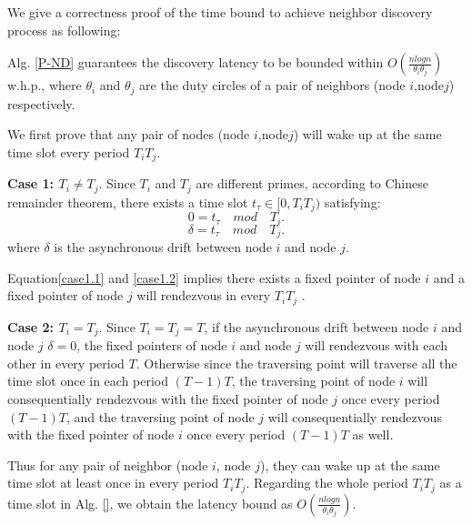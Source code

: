 We give a correctness proof of the time 
bound to achieve neighbor discovery process as following:


\begin{theorem}
\label{PBND1}
Alg. \ref{P-ND} guarantees the discovery latency
to be bounded within $O(\frac{nlogn}{\theta_i\theta_j})$ w.h.p.,
where $\theta_i$ and $\theta_j$ are the duty circles of 
a pair of neighbors (node $i$,node$j$) respectively.
\end{theorem}



\begin{IEEEproof}
We first prove that any pair of nodes (node $i$,node$j$) will wake up 
at the same time slot every period $T_iT_j$.

\textbf{Case 1: $T_i \neq T_j$}. Since $T_i$ and $T_j$ are different primes, 
according to Chinese remainder theorem, there exists a time slot $t_\tau \in \lbrack 0,T_iT_j ) $ satisfying:
\begin{equation}
\label{case1.1}
0 = t_\tau  \quad mod \quad  T_i.
\end{equation}
\begin{equation}
\label{case1.2}
\delta = t_\tau  \quad mod \quad  T_j.
\end{equation}
where $\delta$ is the asynchronous drift between node $i$ and node $j$.

Equation\ref{case1.1} and \ref{case1.2}  implies there exists a fixed pointer of node $i$ 
and a fixed pointer of node $j$ will rendezvous in every $T_iT_j$  .

\textbf{Case 2: $T_i = T_j$}. Since $T_i = T_j = T$, if the asynchronous drift between 
node $i$ and node $j$ $\delta = 0$, the fixed pointers of node $i$ and node $j$ will 
rendezvous with each other in every period $T$.
Otherwise since the traversing point will traverse all the time slot once in each period $(T-1)T$,
the traversing point of node $i$ will consequentially rendezvous with the fixed pointer
of node $j$ once every period $(T-1)T$, and the traversing point of node $j$ 
will consequentially rendezvous with the fixed pointer
of node $i$ once every period $(T-1)T$ as well.

Thus for any pair of neighbor (node $i$, node $j$), they can wake up
at the same time slot at least once in every period $T_iT_j$. Regarding 
the whole period $T_iT_j$ as a time slot in Alg. \ref{}, we obtain the latency 
bound as $O(\frac{nlogn}{\theta_i\theta_j})$.
\end{IEEEproof}




